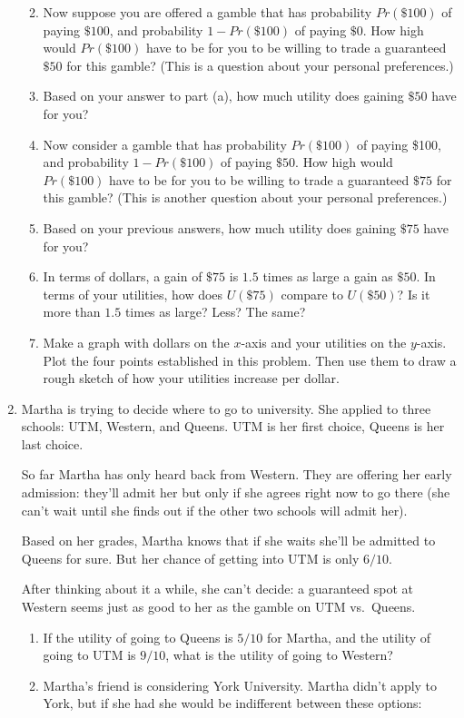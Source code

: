 \documentclass[justified]{tufte-book}
\providecommand{\tightlist}{%
  \setlength{\itemsep}{0pt}\setlength{\parskip}{0pt}}
\renewcommand{\u}{U}
\newcommand{\p}{Pr}
\theoremstyle{definition}
\theoremstyle{definition}
\theoremstyle{definition}
\theoremstyle{remark}
\begin{document}
\begin{enumerate}
  \begin{enumerate}
  \def\labelenumii{\alph{enumii}.}
  \tightlist
  \item
    Now suppose you are offered a gamble that has probability \(\p(\$100)\) of paying \(\$100\), and probability \(1-\p(\$100)\) of paying \(\$0\). How high would \(\p(\$100)\) have to be for you to be willing to trade a guaranteed \(\$50\) for this gamble? (This is a question about your personal preferences.)
  \item
    Based on your answer to part (a), how much utility does gaining \(\$50\) have for you?
  \item
    Now consider a gamble that has probability \(\p(\$100)\) of paying \$100, and probability \(1-\p(\$100)\) of paying \(\$50\). How high would \(\p(\$100)\) have to be for you to be willing to trade a guaranteed \(\$75\) for this gamble? (This is another question about your personal preferences.)
  \item
    Based on your previous answers, how much utility does gaining \(\$75\) have for you?
  \item
    In terms of dollars, a gain of \(\$75\) is \(1.5\) times as large a gain as \(\$50\). In terms of your utilities, how does \(\u(\$75)\) compare to \(\u(\$50)\)? Is it more than \(1.5\) times as large? Less? The same?
  \item
    Make a graph with dollars on the \(x\)-axis and your utilities on the \(y\)-axis. Plot the four points established in this problem. Then use them to draw a rough sketch of how your utilities increase per dollar.
  \end{enumerate}
\item
  Martha is trying to decide where to go to university. She applied to three schools: UTM, Western, and Queens. UTM is her first choice, Queens is her last choice.

  So far Martha has only heard back from Western. They are offering her early admission: they'll admit her but only if she agrees right now to go there (she can't wait until she finds out if the other two schools will admit her).

  Based on her grades, Martha knows that if she waits she'll be admitted to Queens for sure. But her chance of getting into UTM is only \(6/10\).

  After thinking about it a while, she can't decide: a guaranteed spot at Western seems just as good to her as the gamble on UTM vs.~Queens.

  \begin{enumerate}
  \def\labelenumii{\alph{enumii}.}
  \item
    If the utility of going to Queens is \(5/10\) for Martha, and the utility of going to UTM is \(9/10\), what is the utility of going to Western?
  \item
    Martha's friend is considering York University. Martha didn't apply to York, but if she had she would be indifferent between these options:


\end{enumerate}
\end{enumerate}
\end{document}
